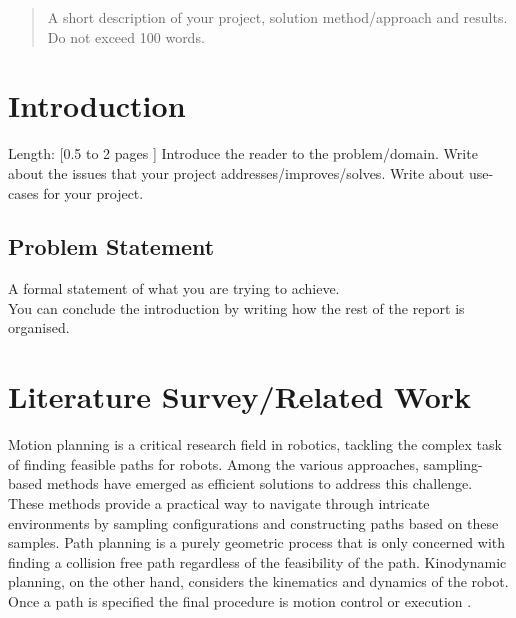 \documentclass[12pt]{report}
\begin{document}
\begin{abstract}
A short description of your project, solution method/approach and results. Do not exceed 100 words. 
\end{abstract}

\tableofcontents

\chapter{Introduction}
Length: [0.5 to 2 pages ]
Introduce the reader to the problem/domain. Write about the issues that your project addresses/improves/solves. Write about use-cases for your project. 
\section{Problem Statement}
A formal statement of what you are trying to achieve. \\

You can conclude the introduction by writing how the rest of the report is organised.

\chapter{Literature Survey/Related Work} 
Motion planning is a critical research field in robotics, tackling the complex task of finding feasible paths for robots. Among the various approaches, sampling-based methods have emerged as efficient solutions to address this challenge\cite{lavalle2006planning}. These methods provide a practical way to navigate through intricate environments by sampling configurations and constructing paths based on these samples. Path planning is a purely geometric process that is only concerned with finding a collision free path regardless of the feasibility of the path. Kinodynamic planning, on the other hand, considers the kinematics and dynamics of the robot. Once a path is specified the final procedure is motion control or execution \cite{6722915}.
\end{document}
